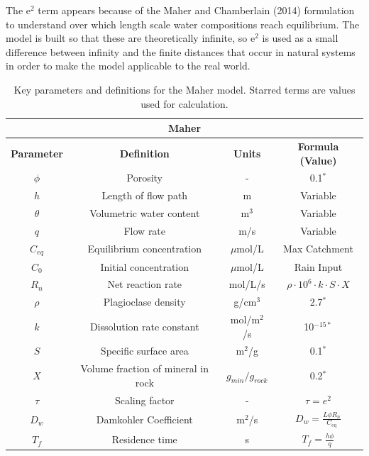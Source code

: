 The e$^2$ term appears because of the Maher and Chamberlain (2014) formulation to understand over which length scale water compositions reach equilibrium. The model is built so that these are theoretically infinite, so e$^2$ is used as a small difference between infinity and the finite distances that occur in natural systems in order to make the model applicable to the real world.

\begin{table}[H]
    \centering
    \renewcommand{\arraystretch}{1.1} %
    \begin{tabular}{|c|c|c|c|}
        \hline  %
        \multicolumn{4}{|c|}{\textbf{Maher}} \\  
        \hline
        \textbf{Parameter} & \textbf{Definition} & \textbf{Units} & \textbf{Formula (Value)} \\
        \hline
        $\phi$ & Porosity & - & 0.1$^*$ \\
        $h$ & Length of flow path & m & Variable \\
        $\theta$ & Volumetric water content & m$^3$ & Variable \\
        $q$ & Flow rate & m/s & Variable \\
        $C_{eq}$ & Equilibrium concentration & $\mu$mol/L & Max Catchment \\
        $C_0$ & Initial concentration & $\mu$mol/L & Rain Input \\
        $R_n$ & Net reaction rate & mol/L/s & $\rho \cdot 10^6 \cdot k \cdot S \cdot X $ \\
        $\rho$ & Plagioclase density & g/cm$^3$ & 2.7$^*$ \\
        $k$ & Dissolution rate constant & mol/m$^2$/s & 10$^{-15*}$ \\
        $S$ & Specific surface area & m$^2$/g & 0.1$^*$ \\
        $X$ & Volume fraction of mineral in rock & $g_{min}/g_{rock}$& 0.2$^*$ \\
        $\tau$ & Scaling factor & - & $\tau = e^2$ \\
        $D_w$ & Damkohler Coefficient & m$^2$/s & $D_w = \frac{L \phi R_n}{C_{\text{eq}}}$ \\
        $T_f$ & Residence time & s & $T_f = \frac{h \phi}{q}$ \\
        \hline
    \end{tabular}
    \caption{Key parameters and definitions for the Maher model. Starred terms are values used for calculation.}
    \label{tab:maher1}
\end{table}

